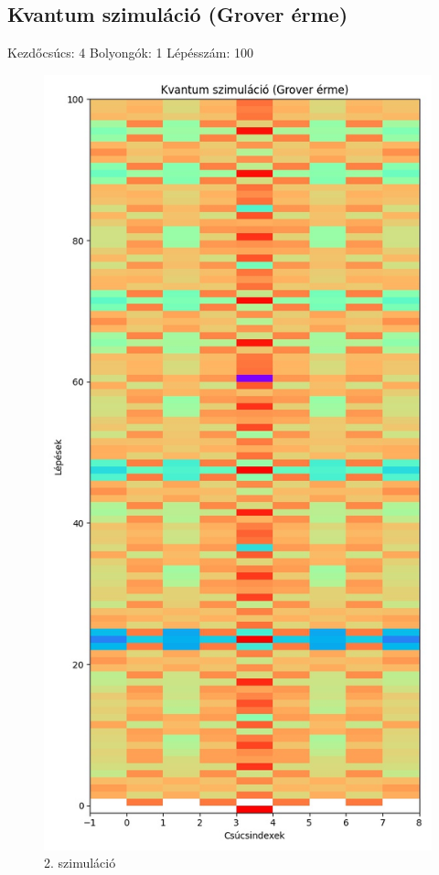 \documentclass[14pt,a4paper]{article}
\begin{document}
\subsection{Kvantum szimuláció (Grover érme)}
Kezdőcsúcs: 4
Bolyongók: 1
Lépésszám: 100
\begin{figure}[H]
\centering
\includegraphics[width = 0.7\columnwidth]{sim_02/counts.jpg}
\caption{2. szimuláció}
\end{figure}
\end{document}
